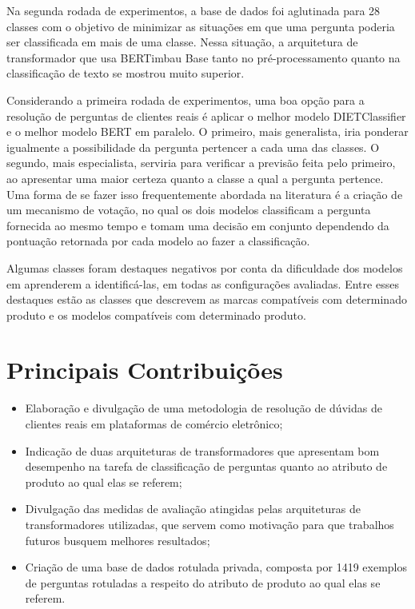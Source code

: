 Na segunda rodada de experimentos, a base de dados foi aglutinada para 28 classes com o objetivo de minimizar as situações em que uma pergunta poderia ser classificada em mais de uma classe. Nessa situação, a arquitetura de transformador que usa BERTimbau Base tanto no pré-processamento quanto na classificação de texto se mostrou muito superior.

Considerando a primeira rodada de experimentos, uma boa opção para a resolução de perguntas de clientes reais é aplicar o melhor modelo DIETClassifier e o melhor modelo BERT em paralelo. O primeiro, mais generalista, iria ponderar igualmente a possibilidade da pergunta pertencer a cada uma das classes. O segundo, mais especialista, serviria para verificar a previsão feita pelo primeiro, ao apresentar uma maior certeza quanto a classe a qual a pergunta pertence. Uma forma de se fazer isso frequentemente abordada na literatura é a criação de um mecanismo de votação, no qual os dois modelos classificam a pergunta fornecida ao mesmo tempo e tomam uma decisão em conjunto dependendo da pontuação retornada por cada modelo ao fazer a classificação.

Algumas classes foram destaques negativos por conta da dificuldade dos modelos em aprenderem a identificá-las, em todas as configurações avaliadas. Entre esses destaques estão as classes que descrevem as marcas compatíveis com determinado produto e os modelos compatíveis com determinado produto.

\section{Principais Contribuições}
\begin{itemize}
    \item Elaboração e divulgação de uma metodologia de resolução de dúvidas de clientes reais em plataformas de comércio eletrônico;
    \item Indicação de duas arquiteturas de transformadores que apresentam bom desempenho na tarefa de classificação de perguntas quanto ao atributo de produto ao qual elas se referem;
    \item Divulgação das medidas de avaliação atingidas pelas arquiteturas de transformadores utilizadas, que servem como motivação para que trabalhos futuros busquem melhores resultados;
    \item Criação de uma base de dados rotulada privada, composta por 1419 exemplos de perguntas rotuladas a respeito do atributo de produto ao qual elas se referem.
\end{itemize}

